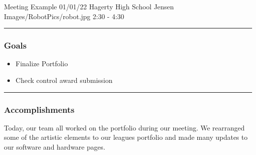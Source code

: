 \insertmeeting 
	{Meeting Example} 
	{01/01/22} 
	{Hagerty High School}
	{Jensen}
	{Images/RobotPics/robot.jpg}
	{2:30 - 4:30}
	
\noindent\hfil\rule{\textwidth}{.4pt}\hfil
\subsubsection*{Goals}
\begin{itemize}
    \item Finalize Portfolio
    \item Check control award submission

\end{itemize} 

\noindent\hfil\rule{\textwidth}{.4pt}\hfil

\subsubsection*{Accomplishments}
Today, our team all worked on the portfolio during our meeting. We rearranged some of the artistic elements to our leagues portfolio and made many updates to our software and hardware pages. 
 

